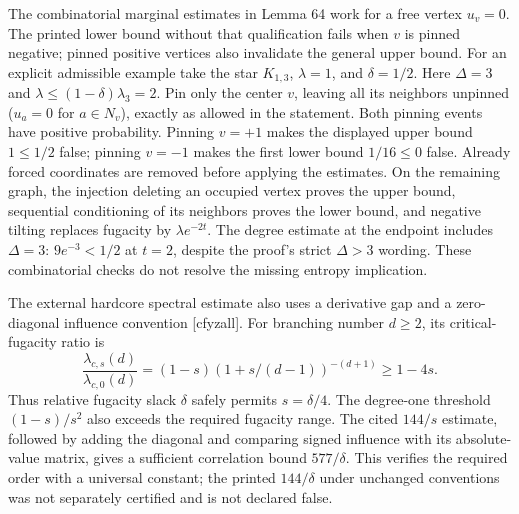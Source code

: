 \documentclass[10pt]{article}
\begin{document}
The combinatorial marginal estimates in Lemma 64 work for a free vertex \(u_v=0\). The printed lower bound without that qualification fails when \(v\) is pinned negative; pinned positive vertices also invalidate the general upper bound. For an explicit admissible example take the star \(K_{1,3}\), \(\lambda=1\), and \(\delta=1/2\). Here \(\Delta=3\) and \(\lambda\le(1-\delta)\lambda_3=2\). Pin only the center \(v\), leaving all its neighbors unpinned (\(u_a=0\) for \(a\in N_v\)), exactly as allowed in the statement. Both pinning events have positive probability. Pinning \(v=+1\) makes the displayed upper bound \(1\le1/2\) false; pinning \(v=-1\) makes the first lower bound \(1/16\le0\) false. Already forced coordinates are removed before applying the estimates. On the remaining graph, the injection deleting an occupied vertex proves the upper bound, sequential conditioning of its neighbors proves the lower bound, and negative tilting replaces fugacity by \(\lambda e^{-2t}\). The degree estimate at the endpoint includes \(\Delta=3\): \(9e^{-3}<1/2\) at \(t=2\), despite the proof’s strict \(\Delta>3\) wording. These combinatorial checks do not resolve the missing entropy implication.\par
The external hardcore spectral estimate also uses a derivative gap and a zero-diagonal influence convention [cfyzall]. For branching number \(d\ge2\), its critical-fugacity ratio is \[\frac{\lambda_{c,s}(d)}{\lambda_{c,0}(d)}
   =(1-s)(1+s/(d-1))^{-(d+1)}\ge1-4s.\] Thus relative fugacity slack \(\delta\) safely permits \(s=\delta/4\). The degree-one threshold \((1-s)/s^2\) also exceeds the required fugacity range. The cited \(144/s\) estimate, followed by adding the diagonal and comparing signed influence with its absolute-value matrix, gives a sufficient correlation bound \(577/\delta\). This verifies the required order with a universal constant; the printed \(144/\delta\) under unchanged conventions was not separately certified and is not declared false.\par
\end{document}
